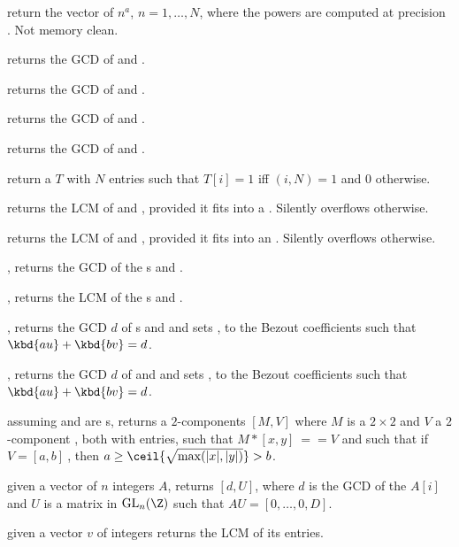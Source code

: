  return the vector of $n^a$, $n
= 1, \dots, N$, where the powers are computed at precision . Not
memory clean.


 returns the GCD of  and .

 returns the GCD of  and .

 returns the GCD of  and .

 returns the GCD of  and .

 return a  $T$ with $N$ entries
such that $T[i] = 1$ iff $(i,N) = 1$ and $0$ otherwise.

 returns the LCM of  and ,
provided it fits into a . Silently overflows otherwise.

 returns the LCM of  and ,
provided it fits into an . Silently overflows otherwise.

, returns the GCD of the s  and
.

, returns the LCM of the s  and
.

, returns the GCD $d$ of
s  and  and sets ,  to the Bezout
coefficients such that $\kbd{au} + \kbd{bv} = d$.

, returns the GCD
$d$ of  and  and sets ,  to the Bezout coefficients
such that $\kbd{au} + \kbd{bv} = d$.

assuming  and  are s,
returns a $2$-components  $[M,V]$ where $M$ is a $2\times 2$
 and $V$ a $2$-component , both with  entries,
such that $M*[x,y]~==V$ and such that  if $V=[a,b]~$, then
$a \geq \ceil{\sqrt{\max(|x|,|y|)}} > b$.

 given a vector of $n$ integers $A$, returns $[d,
U]$, where $d$ is the GCD of the $A[i]$ and $U$ is a matrix
in $\text{GL}_n(\Z)$ such that $AU = [0,\dots,0,D]$.

 given a vector $v$ of integers
returns the LCM of its entries.

